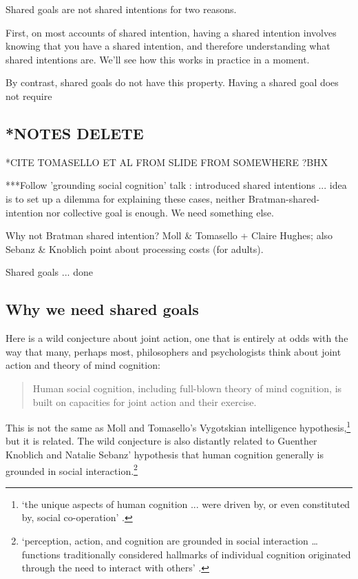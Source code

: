 \documentclass[12pt,a4paper]{extarticle}
\begin{document}
Shared goals are not shared intentions for two reasons.

First, on most accounts of shared intention, having a shared intention involves knowing that you have a shared intention, and therefore understanding what shared intentions are.  We'll see how this works in practice in a moment.

By contrast, shared goals do not have this property.  Having a shared goal does not require 


\subsection{*NOTES DELETE}
*CITE TOMASELLO ET AL FROM SLIDE FROM SOMEWHERE ?BHX

***Follow 'grounding social cognition' talk : introduced shared intentions ... idea is to set up a dilemma for explaining these cases, neither Bratman-shared-intention nor collective goal is enough.  We need something else.

Why not Bratman shared intention?  Moll \& Tomasello + Claire Hughes; also Sebanz \& Knoblich point about processing costs (for adults).

Shared goals ... done



\subsection{Why we need shared goals}

Here is a wild conjecture about joint action, one that is entirely at odds with the way that many, perhaps most, philosophers and psychologists think about joint action and theory of mind cognition:

\begin{quote}
Human social cognition, including full-blown theory of mind cognition, is built on capacities for joint action and their exercise.
\end{quote}
%
This is not the same as Moll and Tomasello's Vygotskian intelligence hypothesis,\footnote{
`the unique aspects of human cognition ... were driven by, or even constituted by, social co-operation'
\citep[p.\ 1]{Moll:2007gu}.
}
 but it is related.  The wild conjecture is also distantly related to Guenther Knoblich and Natalie Sebanz' hypothesis that human cognition generally is grounded in social interaction.\footnote{
`perception, action, and cognition are grounded in social interaction … functions traditionally considered hallmarks of individual cognition originated through the need to interact with others' \citep[p.\ 103]{Knoblich:2006bn}.
 }
\end{document}
